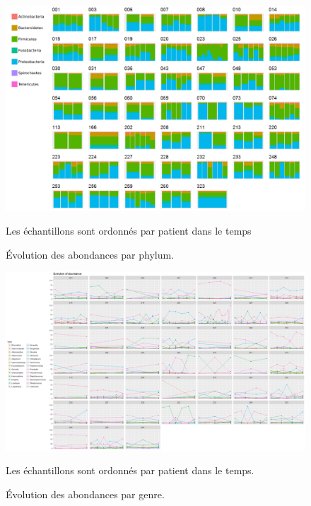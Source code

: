 \documentclass[12pt,a4paper]{article}
\begin{document}
\begin{figure}[H]
\begin{center}
\includegraphics[width=\textwidth]{img/enfin_barplot_phylum_norm.png}\hfill
\caption{Évolution des abondances par phylum.} Les échantillons sont ordonnés par patient dans le temps
\label{plotabundancephylum}
\end{center}
\end{figure}


\begin{figure}[H]
\begin{center}
\includegraphics[scale=0.44,angle=90]{img/evolution_abundance.png}\hfill
\caption{Évolution des abondances par genre.}
Les échantillons sont ordonnés par patient dans le temps.
\label{plotabundancecurve}

\end{center}

\end{figure}
\end{document}
